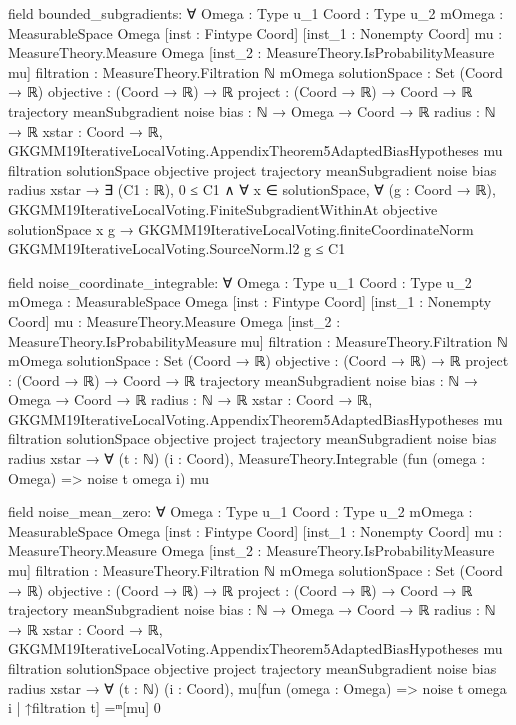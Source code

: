 \documentclass[10pt]{article}
\begin{document}
\begin{ReviewVerbatim}
field bounded_subgradients:
∀ {Omega : Type u_1} {Coord : Type u_2} {mOmega : MeasurableSpace Omega} [inst : Fintype Coord]
  [inst_1 : Nonempty Coord] {mu : MeasureTheory.Measure Omega} [inst_2 : MeasureTheory.IsProbabilityMeasure mu]
  {filtration : MeasureTheory.Filtration ℕ mOmega} {solutionSpace : Set (Coord → ℝ)} {objective : (Coord → ℝ) → ℝ}
  {project : (Coord → ℝ) → Coord → ℝ} {trajectory meanSubgradient noise bias : ℕ → Omega → Coord → ℝ} {radius : ℕ → ℝ}
  {xstar : Coord → ℝ},
  GKGMM19IterativeLocalVoting.AppendixTheorem5AdaptedBiasHypotheses mu filtration solutionSpace objective project
      trajectory meanSubgradient noise bias radius xstar →
    ∃ (C1 : ℝ),
      0 ≤ C1 ∧
        ∀ x ∈ solutionSpace,
          ∀ (g : Coord → ℝ),
            GKGMM19IterativeLocalVoting.FiniteSubgradientWithinAt objective solutionSpace x g →
              GKGMM19IterativeLocalVoting.finiteCoordinateNorm GKGMM19IterativeLocalVoting.SourceNorm.l2 g ≤ C1

field noise_coordinate_integrable:
∀ {Omega : Type u_1} {Coord : Type u_2} {mOmega : MeasurableSpace Omega} [inst : Fintype Coord]
  [inst_1 : Nonempty Coord] {mu : MeasureTheory.Measure Omega} [inst_2 : MeasureTheory.IsProbabilityMeasure mu]
  {filtration : MeasureTheory.Filtration ℕ mOmega} {solutionSpace : Set (Coord → ℝ)} {objective : (Coord → ℝ) → ℝ}
  {project : (Coord → ℝ) → Coord → ℝ} {trajectory meanSubgradient noise bias : ℕ → Omega → Coord → ℝ} {radius : ℕ → ℝ}
  {xstar : Coord → ℝ},
  GKGMM19IterativeLocalVoting.AppendixTheorem5AdaptedBiasHypotheses mu filtration solutionSpace objective project
      trajectory meanSubgradient noise bias radius xstar →
    ∀ (t : ℕ) (i : Coord), MeasureTheory.Integrable (fun (omega : Omega) => noise t omega i) mu

field noise_mean_zero:
∀ {Omega : Type u_1} {Coord : Type u_2} {mOmega : MeasurableSpace Omega} [inst : Fintype Coord]
  [inst_1 : Nonempty Coord] {mu : MeasureTheory.Measure Omega} [inst_2 : MeasureTheory.IsProbabilityMeasure mu]
  {filtration : MeasureTheory.Filtration ℕ mOmega} {solutionSpace : Set (Coord → ℝ)} {objective : (Coord → ℝ) → ℝ}
  {project : (Coord → ℝ) → Coord → ℝ} {trajectory meanSubgradient noise bias : ℕ → Omega → Coord → ℝ} {radius : ℕ → ℝ}
  {xstar : Coord → ℝ},
  GKGMM19IterativeLocalVoting.AppendixTheorem5AdaptedBiasHypotheses mu filtration solutionSpace objective project
      trajectory meanSubgradient noise bias radius xstar →
    ∀ (t : ℕ) (i : Coord), mu[fun (omega : Omega) => noise t omega i | ↑filtration t] =ᵐ[mu] 0


\end{ReviewVerbatim}
\end{document}
